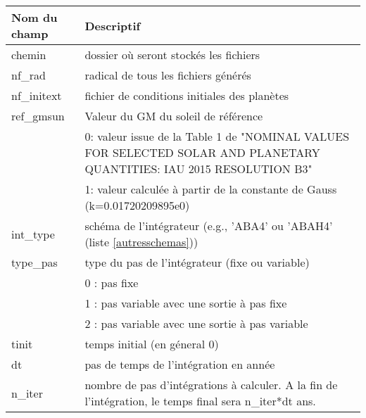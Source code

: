 \documentclass[11pt]{article}
\begin{document}
\begin{tabularx}{\textwidth}{|l|X|}
\hline
Nom du champ& Descriptif \\ \hline 
chemin   & dossier o\`u seront stock\'es les fichiers \\ \hline
 nf\_rad    & radical de tous les fichiers g\'en\'er\'es\\ \hline
 nf\_initext& fichier de conditions initiales des plan\`etes\\ \hline

 ref\_gmsun& Valeur du GM du soleil de r\'ef\'erence \\ 
& 0: valeur issue de la Table 1 de "NOMINAL VALUES FOR SELECTED SOLAR AND PLANETARY QUANTITIES: IAU 2015 RESOLUTION B3"\\
& 1: valeur calculée à partir de la constante de Gauss (k=0.01720209895e0) \\\hline

 int\_type& sch\'ema de l'int\'egrateur (e.g., 'ABA4' ou 'ABAH4' (liste \ref{autresschemas})) \\ \hline

 type\_pas & type du pas de l'int\'egrateur (fixe ou variable) \\ 
 & 0 : pas fixe \\ 
 & 1 : pas variable avec une sortie \`a pas fixe \\
& 2 : pas variable avec une sortie \`a pas variable \\ \hline

 tinit & temps initial (en g\'eneral 0) \\ \hline

 dt& pas de temps de l'int\'egration en ann\'ee \\ \hline

 n\_iter& nombre de pas d'int\'egrations \`a calculer. A la fin de l'int\'egration, le temps final sera  n\_iter*dt ans.\\ \hline


\end{tabularx}
\end{document}
